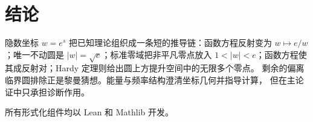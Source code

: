 \documentclass[submission,noinfoline]{jsfds}
\begin{document}
\section{结论}\label{sec:conclusion}

隐数坐标 $w=e^s$ 把已知理论组织成一条短的推导链：函数方程反射变为
$w\mapsto e/w$；唯一不动圆是 $|w|=\sqrt e$；标准零域把非平凡零点放入
$1<|w|<e$；函数方程使其成反射对；Hardy 定理则给出圆上方提升空间中的无限多个零点。
剩余的偏离临界圆排除正是黎曼猜想。能量与频率结构澄清坐标几何并指导计算，
但在主论证中只承担诊断作用。

所有形式化组件均以 Lean \citep{deMoura2015} 和 Mathlib
\citep{MathlibCommunity2020} 开发。


\end{document}
